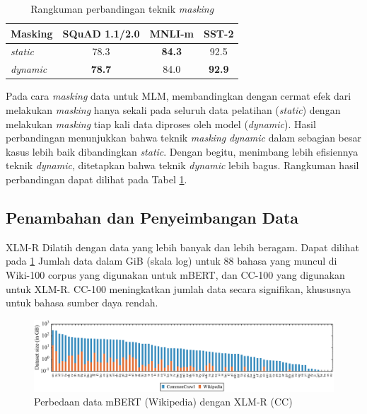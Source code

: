         \begin{table}[b]
            \centering
            \caption{Rangkuman perbandingan teknik \textit{masking} \parencite{Liu_Ott_Goyal_Du_Joshi_Chen_Levy_Lewis_Zettlemoyer_Stoyanov_2019} }
            \begin{tabular}{lccc}
                \hline
                \textbf{Masking} & \textbf{SQuAD 1.1/2.0} & \textbf{MNLI-m} & \textbf{SST-2} \\ \hline
                \textit{static}  & 78.3                   & \textbf{84.3}   & 92.5           \\
                \textit{dynamic} & \textbf{78.7}          & 84.0            & \textbf{92.9}  \\ \hline
            \end{tabular}
            \label{tab:rangkuman_roberta_2}
        \end{table}

        Pada cara \textit{masking} data untuk MLM, \parencite{Liu_Ott_Goyal_Du_Joshi_Chen_Levy_Lewis_Zettlemoyer_Stoyanov_2019} membandingkan dengan cermat efek dari melakukan \textit{masking} hanya sekali pada seluruh data pelatihan (\textit{static}) dengan melakukan \textit{masking} tiap kali data diproses oleh model (\textit{dynamic}). Hasil perbandingan menunjukkan bahwa teknik \textit{masking} \textit{dynamic} dalam sebagian besar kasus lebih baik dibandingkan \textit{static}. Dengan begitu, menimbang lebih efisiennya teknik \textit{dynamic}, ditetapkan bahwa teknik \textit{dynamic} lebih bagus. Rangkuman hasil perbandingan dapat dilihat pada Tabel \ref{tab:rangkuman_roberta_2}.

        \subsection{Penambahan dan Penyeimbangan Data}
        XLM-R Dilatih dengan data yang lebih banyak dan lebih beragam. Dapat dilihat pada \ref{fig:data_xlm_r} Jumlah data dalam GiB (skala log) untuk 88 bahasa yang muncul di Wiki-100 corpus yang digunakan untuk mBERT, dan CC-100 yang digunakan untuk XLM-R. CC-100 meningkatkan jumlah data secara signifikan, khususnya untuk bahasa sumber daya rendah.

        \begin{figure}[ht]
            \centering
            \includegraphics[width=1\textwidth]{resources/data_xlm_r.png}
            \caption{Perbedaan data mBERT (Wikipedia) dengan XLM-R (CC) \parencite{Conneau_XLMR}}
            \label{fig:data_xlm_r}
        \end{figure}

